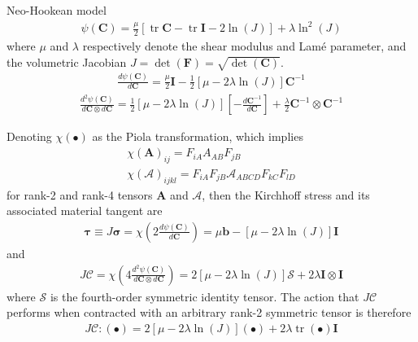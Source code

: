 \documentclass[preprint,12pt,times]{elsarticle}
\DeclareMathOperator{\trace}{tr}
\begin{document}
Neo-Hookean model
\begin{gather}
\psi \left( \mathbf{C} \right)
  = \frac{\mu}{2} \left[ \trace{\mathbf{C}} - \trace{\mathbf{I}} - 2 \ln\left( J \right) \right]
  + \lambda \ln^{2}\left( J \right)
\end{gather}
where $\mu$ and $\lambda$ respectively denote the shear modulus and Lam\'{e} parameter,
and the volumetric Jacobian $J = \det\left(\mathbf{F}\right) = \sqrt{\det\left(\mathbf{C}\right)}$.
\begin{gather}
\frac{d \psi \left( \mathbf{C} \right)}{d \mathbf{C}}
  = \frac{\mu}{2} \mathbf{I} - \frac{1}{2} \left[ \mu - 2\lambda\ln\left( J \right) \right] \mathbf{C}^{-1}
\end{gather}
\begin{gather}
\frac{d^{2} \psi \left( \mathbf{C} \right)}{d \mathbf{C} \otimes d \mathbf{C}}
  = \frac{1}{2}\left[ \mu - 2\lambda\ln\left( J \right) \right] \left[ - \frac{d \mathbf{C}^{-1}}{d \mathbf{C}} \right]
  + \frac{\lambda}{2} \mathbf{C}^{-1} \otimes \mathbf{C}^{-1}
\end{gather}

Denoting $\chi\left( \bullet \right)$ as the Piola transformation, which implies
\begin{gather}
\chi\left( \mathbf{A} \right)_{ij}
  = F_{iA} A_{AB} F_{jB} \\
\chi\left( \boldsymbol{\mathcal{A}} \right)_{ijkl}
  = F_{iA} F_{jB} \mathcal{A}_{ABCD} F_{kC} F_{lD}
\end{gather}
for rank-2 and rank-4 tensors $\mathbf{A}$ and $\boldsymbol{\mathcal{A}}$, then the Kirchhoff stress and its associated material tangent are
\begin{gather}
\boldsymbol{\tau}
  \equiv J \boldsymbol{\sigma}
  = \chi\left( 2 \frac{d \psi \left( \mathbf{C} \right)}{d \mathbf{C}} \right)
  = \mu \mathbf{b} - \left[ \mu - 2\lambda\ln\left( J \right) \right] \mathbf{I}
\end{gather}
and
\begin{gather}
J \boldsymbol{\mathcal{C}}
  = \chi\left( 4 \frac{d^{2} \psi \left( \mathbf{C} \right)}{d \mathbf{C} \otimes d \mathbf{C}} \right)
  = 2 \left[ \mu - 2\lambda\ln\left( J \right) \right] \boldsymbol{\mathcal{S}}
  + 2 \lambda \mathbf{I} \otimes \mathbf{I}
\end{gather}
where $\boldsymbol{\mathcal{S}}$ is the fourth-order symmetric identity tensor.
The action that $J \boldsymbol{\mathcal{C}}$ performs when contracted with an arbitrary rank-2 symmetric tensor is therefore
\begin{gather}
J \boldsymbol{\mathcal{C}} : \left( \bullet \right)
  = 2 \left[ \mu - 2\lambda\ln\left( J \right) \right] \left( \bullet \right)
  + 2 \lambda \trace\left( \bullet \right) \mathbf{I}
\end{gather}
\end{document}
